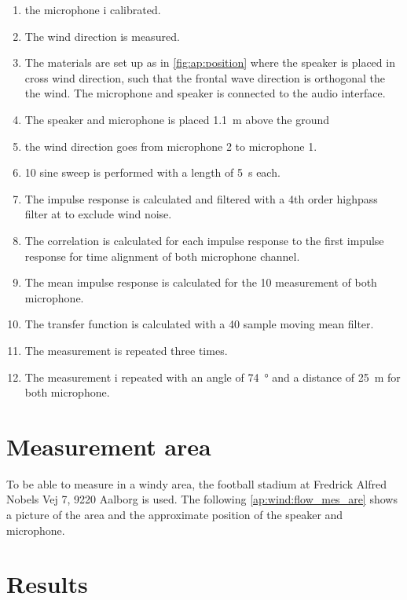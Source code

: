 \begin{enumerate}
\item the microphone i calibrated.
\item The wind direction is measured.
\item The materials are set up as in \autoref{fig:ap:position} where the speaker is placed in cross wind direction, such that the frontal wave direction is orthogonal the the wind. The microphone and speaker is connected to the audio interface.
\item The speaker and microphone is placed \SI{1.1}{\meter} above the ground
\item the wind direction goes from microphone 2 to microphone 1.
\item 10 sine sweep is performed with a length of \SI{5}{\second} each. 
\item The impulse response is calculated and filtered with a 4th order highpass filter at  to exclude wind noise.
\item The correlation is calculated for each impulse response to the first impulse response for time alignment \citep{gunness2001loudspeaker} of both microphone channel.
\item The mean impulse response is calculated for the 10 measurement of both microphone.
\item The transfer function is calculated with a 40 sample moving mean filter.
\item The measurement is repeated three times.
\item The measurement i repeated with an angle of \SI{74}{\degree} and a distance of \SI{25}{\meter} for both microphone.
\end{enumerate}


\section*{Measurement area}
To be able to measure in a windy area, the football stadium at Fredrick Alfred Nobels Vej 7, 9220 Aalborg is used. The following \autoref{ap:wind:flow_mes_are} shows a picture of the area and the approximate position of the speaker and microphone.


\section*{Results}

